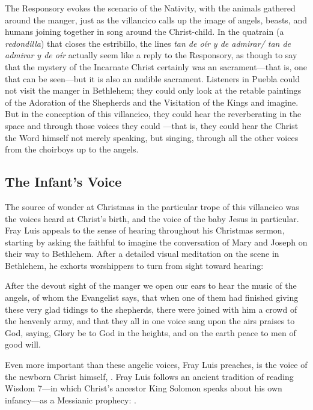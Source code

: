 The Responsory evokes the scenario of the Nativity, with the animals gathered
around the manger, just as the villancico calls up the image of angels, beasts,
and humans joining together in song around the Christ-child.
In the quatrain (a \emph{redondilla}) that closes the estribillo, the lines
\emph{tan de oír y de admirar/ tan de admirar y de oír} actually seem like a
reply to the Responsory, as though to say that the mystery of the Incarnate
Christ certainly was an  sacrament---that is, one that can be
seen---but it is also an audible sacrament.
Listeners in Puebla could not visit the manger in Bethlehem; they could only
look at the retable paintings of the Adoration of the Shepherds and the
Visitation of the Kings and imagine.
But in the conception of this villancico, they could hear the  reverberating in the space and through those voices they could
---that is,
they could hear the Christ the Word himself not merely speaking, but singing,
through all the other voices from the choirboys up to the angels.

\subsection{The Infant's Voice}

The source of wonder at Christmas in the particular trope of this villancico was
the voices heard at Christ's birth, and the voice of the baby Jesus in
particular.
Fray Luis appeals to the sense of hearing throughout his Christmas sermon,
starting by asking the faithful to imagine the conversation of Mary and Joseph
on their way to Bethlehem.
After a detailed visual meditation on the scene in Bethlehem, he exhorts
worshippers to turn from sight toward hearing:
\begin{quoting}
    After the devout sight of the manger we open our ears to hear the music of
    the angels, of whom the Evangelist says, that when one of them had finished
    giving these very glad tidings to the shepherds, there were joined with him
    a crowd of the heavenly army, and that they all in one voice sang upon the
    airs praises to God, saying, Glory be to God in the heights, and on the
    earth peace to men of good will.%
        \Autocite[40]{LuisdeGranada:Xmas}
\end{quoting}
Even more important than these angelic voices, Fray Luis preaches, is the voice
of the newborn Christ himself, .
Fray Luis follows an ancient tradition of reading Wisdom 7---in which Christ's
ancestor King Solomon speaks about his own infancy---as a Messianic prophecy:
.%
    \Autocites[37--38]{LuisdeGranada:Xmas}
    [Cf.][670, on .]{Lapide:Gospels19C}

